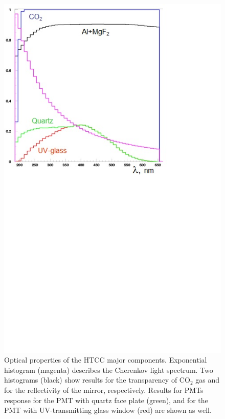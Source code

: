 \begin{figure}[!ht]
    \centering
    \includegraphics[width=1.0\linewidth,trim={0.0cm 10.7cm 3.7cm 0.1cm},clip]{images/PROPERTIES.jpg}
    \caption{Optical properties of the HTCC major components. Exponential histogram (magenta) describes the Cherenkov light spectrum. Two histograms (black) show results for the transparency of CO$_2$ gas and for the reflectivity of the mirror, respectively. Results for PMTs response for the PMT with quartz face plate (green), and for the PMT with UV-transmitting glass window (red) are shown as well.} 
    \label{fig:PROPERTIES}
\end{figure}

